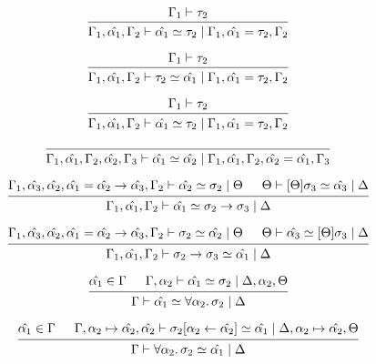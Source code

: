 \documentclass[12pt]{article}
\begin{document}
\[
    \begin{prooftree}
        \hypo{\Gamma_1 \vdash \tau_2}
        \infer1{\Gamma_1, \hat{\alpha_1}, \Gamma_2 \vdash \hat{\alpha_1} \simeq \tau_2 \mid \Gamma_1, \hat{\alpha_1} = \tau_2, \Gamma_2}
    \end{prooftree}
\]

\[
    \begin{prooftree}
        \hypo{\Gamma_1 \vdash \tau_2}
        \infer1{\Gamma_1, \hat{\alpha_1}, \Gamma_2 \vdash \tau_2 \simeq \hat{\alpha_1} \mid \Gamma_1, \hat{\alpha_1} = \tau_2, \Gamma_2}
    \end{prooftree}
\]

\[
    \begin{prooftree}
        \hypo{\Gamma_1 \vdash \tau_2}
        \infer1{\Gamma_1, \hat{\alpha_1}, \Gamma_2 \vdash \hat{\alpha_1} \simeq \tau_2 \mid \Gamma_1, \hat{\alpha_1} = \tau_2, \Gamma_2}
    \end{prooftree}
\]

\[
    \begin{prooftree}
        \infer0{\Gamma_1, \hat{\alpha_1}, \Gamma_2, \hat{\alpha_2}, \Gamma_3 \vdash \hat{\alpha_1} \simeq \hat{\alpha_2} \mid \Gamma_1, \hat{\alpha_1}, \Gamma_2, \hat{\alpha_2} = \hat{\alpha_1}, \Gamma_3}
    \end{prooftree}
\]

\[
    \begin{prooftree}
        \hypo{\Gamma_1, \hat{\alpha_3}, \hat{\alpha_2}, \hat{\alpha_1} = \hat{\alpha_2} \to \hat{\alpha_3}, \Gamma_2 \vdash \hat{\alpha_2} \simeq \sigma_2 \mid \Theta}
        \hypo{\Theta \vdash [\Theta]\sigma_3 \simeq \hat{\alpha_3} \mid \Delta}
        \infer2{\Gamma_1, \hat{\alpha_1}, \Gamma_2 \vdash \hat{\alpha_1} \simeq \sigma_2 \to \sigma_3 \mid \Delta}
    \end{prooftree}
\]

\[
    \begin{prooftree}
        \hypo{\Gamma_1, \hat{\alpha_3}, \hat{\alpha_2}, \hat{\alpha_1} = \hat{\alpha_2} \to \hat{\alpha_3}, \Gamma_2 \vdash \sigma_2 \simeq \hat{\alpha_2} \mid \Theta}
        \hypo{\Theta \vdash \hat{\alpha_3} \simeq [\Theta]\sigma_3 \mid \Delta}
        \infer2{\Gamma_1, \hat{\alpha_1}, \Gamma_2 \vdash \sigma_2 \to \sigma_3 \simeq \hat{\alpha_1} \mid \Delta}
    \end{prooftree}
\]

\[
    \begin{prooftree}
        \hypo{\hat{\alpha_1} \in \Gamma}
        \hypo{\Gamma, \alpha_2 \vdash \hat{\alpha_1} \simeq \sigma_2 \mid \Delta, \alpha_2, \Theta}
        \infer2{\Gamma \vdash \hat{\alpha_1} \simeq \forall \alpha_2\ldotp \sigma_2 \mid \Delta}
    \end{prooftree}
\]

\[
    \begin{prooftree}
        \hypo{\hat{\alpha_1} \in \Gamma}
        \hypo{\Gamma, \alpha_2 \mapsto \hat{\alpha_2}, \hat{\alpha_2} \vdash \sigma_2[\alpha_2 \leftarrow \hat{\alpha_2}] \simeq \hat{\alpha_1} \mid \Delta, \alpha_2 \mapsto \hat{\alpha_2}, \Theta}
        \infer2{\Gamma \vdash \forall \alpha_2\ldotp \sigma_2 \simeq \hat{\alpha_1} \mid \Delta}
    \end{prooftree}
\]
\end{document}

